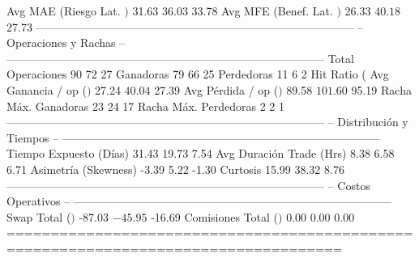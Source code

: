   Avg MAE (Riesgo Lat. $)     $          31.63  $          36.03  $          33.78
  Avg MFE (Benef. Lat. $)     $          26.33  $          40.18  $          27.73
------------------------------------------------------------------------------------
  -- Operaciones y Rachas --
------------------------------------------------------------------------------------
  Total Operaciones                         90                72                27
  Ganadoras                                 79                66                25
  Perdedoras                                11                 6                 2
  Hit Ratio (%
  Avg Ganancia / op ($)       $          27.24  $          40.04  $          27.39
  Avg Pérdida / op ($)        $          89.58  $         101.60  $          95.19
  Racha Máx. Ganadoras                      23                24                17
  Racha Máx. Perdedoras                      2                 2                 1
------------------------------------------------------------------------------------
  -- Distribución y Tiempos --
------------------------------------------------------------------------------------
  Tiempo Expuesto (Días)                 31.43             19.73              7.54
  Avg Duración Trade (Hrs)                8.38              6.58              6.71
  Asimetría (Skewness)                   -3.39              5.22             -1.30
  Curtosis                               15.99             38.32              8.76
------------------------------------------------------------------------------------
  -- Costos Operativos --
------------------------------------------------------------------------------------
  Swap Total ($)              $         -87.03  $         -45.95  $         -16.69
  Comisiones Total ($)        $           0.00  $           0.00  $           0.00
====================================================================================


